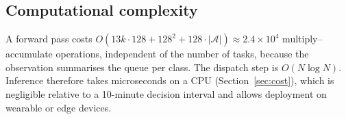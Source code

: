 \subsection{Computational complexity}
A forward pass costs $O(13k\cdot128+128^2+128\cdot|\mathcal A|)\approx2.4\times10^4$ multiply--accumulate operations, independent of the number of tasks, because the observation summarises the queue per class. The dispatch step is $O(N\log N)$. Inference therefore takes microseconds on a CPU (Section~\ref{sec:cost}), which is negligible relative to a 10-minute decision interval and allows deployment on wearable or edge devices.
